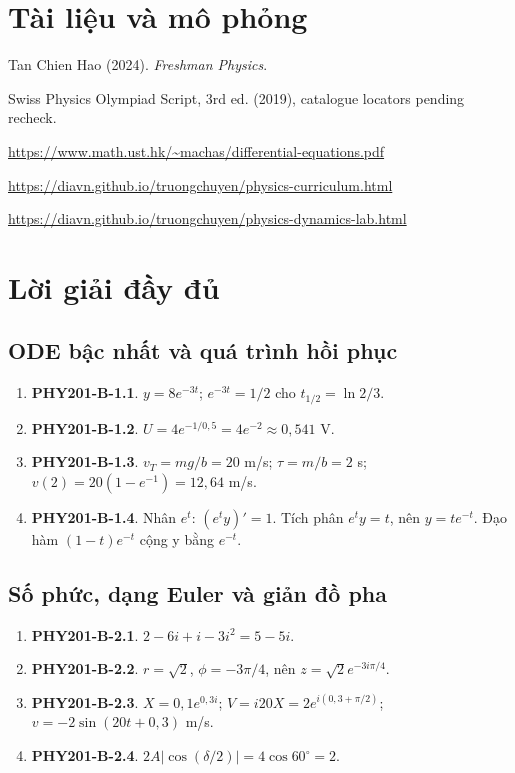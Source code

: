 \documentclass[11pt,a4paper,openany]{book}
\begin{document}
\chapter*{Tài liệu và mô phỏng}
Tan Chien Hao (2024). \textit{Freshman Physics}.\par
Swiss Physics Olympiad Script, 3rd ed. (2019), catalogue locators pending recheck.\par
\url{https://www.math.ust.hk/~machas/differential-equations.pdf}\par
\url{https://diavn.github.io/truongchuyen/physics-curriculum.html}\par
\url{https://diavn.github.io/truongchuyen/physics-dynamics-lab.html}
\appendix
\chapter{Lời giải đầy đủ}
\section{ODE bậc nhất và quá trình hồi phục}
\begin{enumerate}
\item \textbf{PHY201-B-1.1}. $y=8e^{-3t}$; $e^{-3t}=1/2$ cho $t_{1/2}=\ln2/3$.
\item \textbf{PHY201-B-1.2}. $U=4e^{-1/0{,}5}=4e^{-2}\approx0{,}541$ V.
\item \textbf{PHY201-B-1.3}. $v_T=mg/b=20$ m/s; $\tau=m/b=2$ s; $v(2)=20(1-e^{-1})=12{,}64$ m/s.
\item \textbf{PHY201-B-1.4}. Nhân $e^t$: $(e^ty)'=1$. Tích phân $e^ty=t$, nên $y=te^{-t}$. Đạo hàm $(1-t)e^{-t}$ cộng y bằng $e^{-t}$.
\end{enumerate}
\section{Số phức, dạng Euler và giản đồ pha}
\begin{enumerate}
\item \textbf{PHY201-B-2.1}. $2-6i+i-3i^2=5-5i$.
\item \textbf{PHY201-B-2.2}. $r=\sqrt2$, $\phi=-3\pi/4$, nên $z=\sqrt2e^{-3i\pi/4}$.
\item \textbf{PHY201-B-2.3}. $X=0{,}1e^{0{,}3i}$; $V=i20X=2e^{i(0{,}3+\pi/2)}$; $v=-2\sin(20t+0{,}3)$ m/s.
\item \textbf{PHY201-B-2.4}. $2A|\cos(\delta/2)|=4\cos60^\circ=2$.
\end{enumerate}
\end{document}
